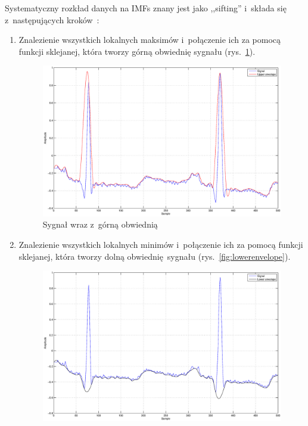 Systematyczny rozkład danych na IMFs znany jest jako ,,sifting'' i~składa się
z~następujących kroków~\cite{ECG-EMD}:
\begin{enumerate}[1.]
    \item Znalezienie wszystkich lokalnych maksimów i~połączenie ich za pomocą
    funkcji sklejanej, która tworzy górną obwiednię sygnału
    (rys.~\ref{fig:upperenvelope}).
    \begin{figure}[!ht]
        \centering
        \includegraphics[width=\textwidth]{../img/upperenvelope.eps}
        \caption{Sygnał wraz z~górną obwiednią}
        \label{fig:upperenvelope}
    \end{figure}
    \newpage
    \item Znalezienie wszystkich lokalnych minimów i~połączenie ich za pomocą
    funkcji sklejanej, która tworzy dolną obwiednię sygnału
    (rys.~\ref{fig:lowerenvelope}).
    \begin{figure}[!ht]
        \centering
        \includegraphics[width=\textwidth]{../img/lowerenvelope.eps}

\end{figure}
\end{enumerate}

